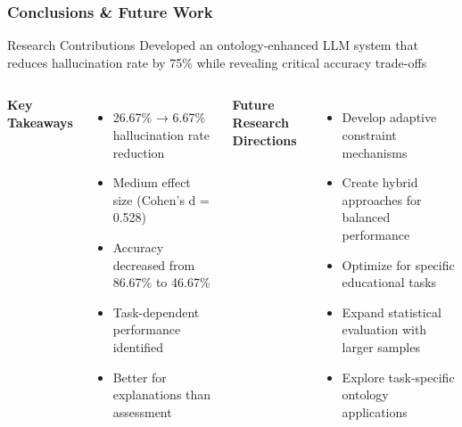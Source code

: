 \documentclass{beamer}
\begin{document}
\begin{frame}
\frametitle{Conclusions \& Future Work}

\begin{alertblock}{Research Contributions}
Developed an ontology-enhanced LLM system that reduces hallucination rate by 75\% while revealing critical accuracy trade-offs
\end{alertblock}

\begin{columns}

\textbf{Key Takeaways}
\begin{itemize}
    \item 26.67\% → 6.67\% hallucination rate reduction
    \item Medium effect size (Cohen's d = 0.528)
    \item Accuracy decreased from 86.67\% to 46.67\%
    \item Task-dependent performance identified
    \item Better for explanations than assessment
\end{itemize}

\textbf{Future Research Directions}
\begin{itemize}
    \item Develop adaptive constraint mechanisms
    \item Create hybrid approaches for balanced performance
    \item Optimize for specific educational tasks
    \item Expand statistical evaluation with larger samples
    \item Explore task-specific ontology applications
\end{itemize}

\end{columns}
\end{frame}

\end{document}
